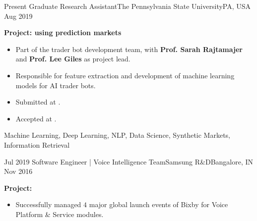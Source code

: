 %
%
%
\vspace{-0.8em}

\begin{experiences}
  \experience
    {Present}     {Graduate Research Assistant}{The Pennsylvania State University}{PA, USA}
    {Aug 2019}    {
                    \textbf{Project:\href{https://www.darpa.mil/program/systematizing-confidence-in-open-research-and-evidence}{\color{accentcolor}{SCORE (Systematizing Confidence in Open Research and Evidence)}} using prediction markets} 
                      \begin{itemize}
                        \item Part of the trader bot development team, with  \textbf{Prof. Sarah  Rajtamajer} and \textbf{Prof. Lee Giles} as project lead.
                        \item Responsible for feature extraction and development of machine learning models for AI trader bots.
                        \item Submitted  at \href{https://2021.naacl.org}{\color{accentcolor}{NAACL2021}}.
                        \item Accepted  at \href{https://aaai.org/Conferences/AAAI-21/}{\color{accentcolor}{AAAI2021}}.
                      \end{itemize}
                    }
                    {Machine Learning, Deep Learning, NLP, Data Science, Synthetic Markets, Information Retrieval}
  \emptySeparator
  
  
  
  
  \experience
    {Jul 2019}     {Software Engineer | Voice Intelligence Team}{Samsung R\&D}{Bangalore, IN}
    {Nov 2016}    {
                    \textbf{Project: \href{https://bixby.developer.samsung.com}{\color{accentcolor}{Bixby Platform \& Services}}}
                      \begin{itemize}
                        \item Successfully managed $4$ major global launch events of Bixby for Voice Platform \& Service modules.
                        

\end{itemize}}
\end{experiences}
